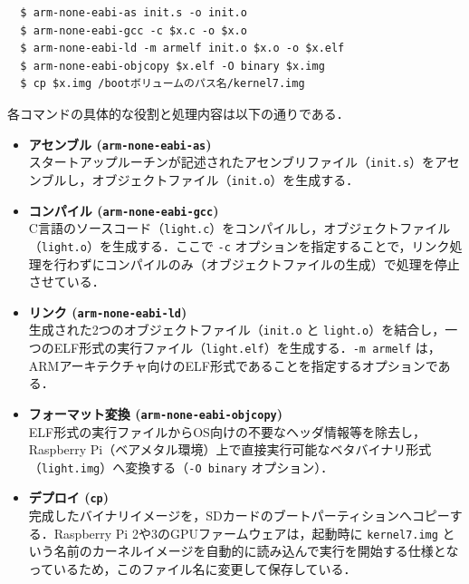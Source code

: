 \documentclass{jlreq}
\begin{document}
  \begin{verbatim}
  $ arm-none-eabi-as init.s -o init.o
  $ arm-none-eabi-gcc -c $x.c -o $x.o
  $ arm-none-eabi-ld -m armelf init.o $x.o -o $x.elf
  $ arm-none-eabi-objcopy $x.elf -O binary $x.img
  $ cp $x.img /bootボリュームのパス名/kernel7.img
  \end{verbatim}

  各コマンドの具体的な役割と処理内容は以下の通りである．

  \begin{itemize}
      \item \textbf{アセンブル (\texttt{arm-none-eabi-as})} \\
      スタートアップルーチンが記述されたアセンブリファイル（\texttt{init.s}）をアセンブルし，オブジェクトファイル（\texttt{init.o}）を生成する．
      
      \item \textbf{コンパイル (\texttt{arm-none-eabi-gcc})} \\
      C言語のソースコード（\texttt{light.c}）をコンパイルし，オブジェクトファイル（\texttt{light.o}）を生成する．ここで \texttt{-c} オプションを指定することで，リンク処理を行わずにコンパイルのみ（オブジェクトファイルの生成）で処理を停止させている．
      
      \item \textbf{リンク (\texttt{arm-none-eabi-ld})} \\
      生成された2つのオブジェクトファイル（\texttt{init.o} と \texttt{light.o}）を結合し，一つのELF形式の実行ファイル（\texttt{light.elf}）を生成する．\texttt{-m armelf} は，ARMアーキテクチャ向けのELF形式であることを指定するオプションである．
      
      \item \textbf{フォーマット変換 (\texttt{arm-none-eabi-objcopy})} \\
      ELF形式の実行ファイルからOS向けの不要なヘッダ情報等を除去し，Raspberry Pi（ベアメタル環境）上で直接実行可能なベタバイナリ形式（\texttt{light.img}）へ変換する（\texttt{-O binary} オプション）．
      
      \item \textbf{デプロイ (\texttt{cp})} \\
      完成したバイナリイメージを，SDカードのブートパーティションへコピーする．Raspberry Pi 2や3のGPUファームウェアは，起動時に \texttt{kernel7.img} という名前のカーネルイメージを自動的に読み込んで実行を開始する仕様となっているため，このファイル名に変更して保存している．
  \end{itemize}
\end{document}
